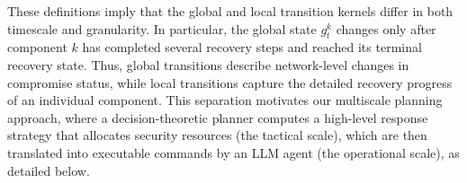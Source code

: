 \documentclass[sigconf]{acmart}
\begin{document}

These definitions imply that the global and local transition kernels differ in both timescale and granularity. In particular, the global state $g^k_t$ changes only after component $k$ has completed several recovery steps and reached its terminal recovery state. Thus, global transitions describe network-level changes in compromise status, while local transitions capture the detailed recovery progress of an individual component. This separation motivates our multiscale planning approach, where a decision-theoretic planner computes a high-level response strategy that allocates security resources (the tactical scale), which are then translated into executable commands by an LLM agent (the operational scale), as detailed below.

\end{document}
